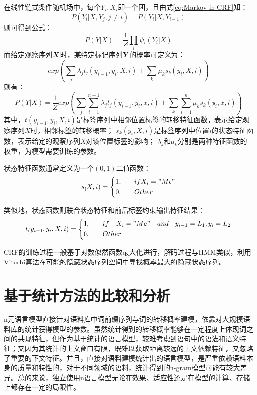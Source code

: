 在线性链式条件随机场中，每个${Y_i, X_i}$即一个团，且由式\ref{eq:Markov-in-CRF}知：
\begin{equation}
    P(Y_i|X, Y_j, j\neq i) = P(Y_i|X, Y_{i-1})
\end{equation}
则可得到公式：
\begin{equation}
    P(Y|X) = \frac{1}{Z}\prod_i\psi_i(Y_i|X)
\end{equation}
而给定观察序列$\boldsymbol{X}$时，某特定标记序列$\boldsymbol{Y}$的概率可定义为：
\begin{equation}
    exp(\sum_j\lambda_j t_j(y_{i-1}, y_i, X, i) + \sum_k \mu_k s_k(y_i, X, i))
\end{equation}
则有：
\begin{equation}
    P(Y|X) = \frac{1}{Z}exp(\sum_j\sum_{i=1}^{n-1}\lambda_j t_j(y_{i-1}, y_i, x, i) + \sum_k\sum_{i=1}^{n}\mu_k s_k(y_i, x, i))
\end{equation}
其中，$t(y_{i-1}, y_i, X, i)$是标签序列中相邻位置标签的转移特征函数，表示给定观察序列$X$时，相邻标签的转移概率；
$s_k(y_i, X, i)$是标签序列中位置$i$的状态特征函数，表示给定的观察序列$X$对该位置标签的影响；
$\lambda_j$和$\mu_k$分别是两种特征函数的权重，为模型需要训练的参数。

状态特征函数通常定义为一个$(0,1)$二值函数：
\begin{equation}
    s_(X, i) = \left\{
        \begin{aligned}
            1, &\qquad if X_i = "Me"\\
            0, &\qquad Other
        \end{aligned}
    \right.
\end{equation}

类似地，状态函数则联合状态特征和前后标签约束输出特征结果：
\begin{equation}
    t_(y_{i-1}, y_i, X, i) = \left\{
        \begin{aligned}
            1, &\qquad if\quad X_i = "Me"\quad and\quad y_{i-1} = L_1, y_i = L_2\\
            0, &\qquad Other
        \end{aligned}
    \right.
\end{equation}

CRF的训练过程一般基于对数似然函数最大化进行，解码过程与HMM类似，利用Viterbi算法在可能的隐藏状态序列空间中寻找概率最大的隐藏状态序列。

\section{基于统计方法的比较和分析}
n元语言模型直接针对语料库中词前缀序列与词的转移概率建模，依靠对大规模语料库的统计获得模型的参数。虽然统计得到的转移概率能够在一定程度上体现词之间的共现特征，但作为基于统计的语言模型，较难考虑到语句中的语法和语义特征；又因为其统计的上文窗口有限，既难以获取距离较远的上文依赖特征，又忽略了重要的下文特征。并且，直接对语料建模统计出的语言模型，是严重依赖语料本身的质量和特性的，对于不同领域的语料，统计得到的n-gram模型可能有较大差异。总的来说，独立使用n语言模型无论在效果、适应性还是在模型的计算、存储上都存在一定的局限性。

